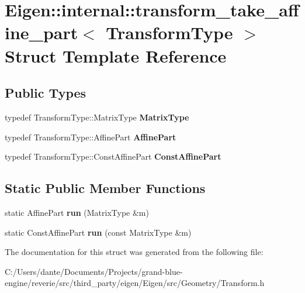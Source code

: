 \hypertarget{struct_eigen_1_1internal_1_1transform__take__affine__part}{}\section{Eigen\+::internal\+::transform\+\_\+take\+\_\+affine\+\_\+part$<$ Transform\+Type $>$ Struct Template Reference}
\label{struct_eigen_1_1internal_1_1transform__take__affine__part}
\subsection*{Public Types}
\begin{DoxyCompactItemize}
\item 
\mbox{\label{struct_eigen_1_1internal_1_1transform__take__affine__part_a21f7faab08ef9da114970a93daed3732}} 
typedef Transform\+Type\+::\+Matrix\+Type {\bfseries Matrix\+Type}
\item 
\mbox{\label{struct_eigen_1_1internal_1_1transform__take__affine__part_a127d3f494b464ed3cad0448e5cdf6626}} 
typedef Transform\+Type\+::\+Affine\+Part {\bfseries Affine\+Part}
\item 
\mbox{\label{struct_eigen_1_1internal_1_1transform__take__affine__part_a6be9d50c0b1ed13a22abb10c208b59de}} 
typedef Transform\+Type\+::\+Const\+Affine\+Part {\bfseries Const\+Affine\+Part}
\end{DoxyCompactItemize}
\subsection*{Static Public Member Functions}
\begin{DoxyCompactItemize}
\item 
\mbox{\label{struct_eigen_1_1internal_1_1transform__take__affine__part_ab03cd5d7709d05188bd6348d1ca97e02}} 
static Affine\+Part {\bfseries run} (Matrix\+Type \&m)
\item 
\mbox{\label{struct_eigen_1_1internal_1_1transform__take__affine__part_a0096db051d90c94fe74f0a0def1fc5f1}} 
static Const\+Affine\+Part {\bfseries run} (const Matrix\+Type \&m)
\end{DoxyCompactItemize}


The documentation for this struct was generated from the following file\+:\begin{DoxyCompactItemize}
\item 
C\+:/\+Users/dante/\+Documents/\+Projects/grand-\/blue-\/engine/reverie/src/third\+\_\+party/eigen/\+Eigen/src/\+Geometry/Transform.\+h\end{DoxyCompactItemize}
